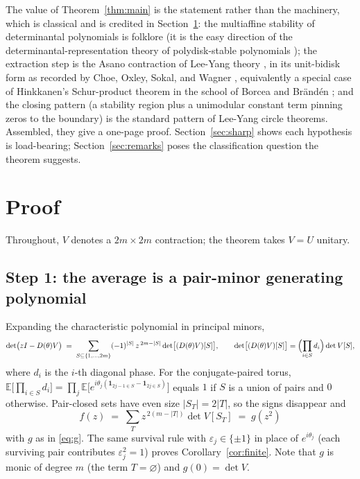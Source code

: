 \documentclass[11pt]{amsart}
\theoremstyle{definition}
\theoremstyle{remark}
\newcommand{\E}{\mathbb{E}}
\begin{document}
The value of Theorem~\ref{thm:main} is the statement rather than the machinery, which is classical and is credited in Section~\ref{sec:proof}: the multiaffine stability of determinantal polynomials is folklore (it is the easy direction of the determinantal-representation theory of polydisk-stable polynomials \cite{GKW13}); the extraction step is the Asano contraction of Lee-Yang theory \cite{Asa70, Rue71}, in its unit-bidisk form as recorded by Choe, Oxley, Sokal, and Wagner \cite[Remark after Prop.~4.19]{COSW04}, equivalently a special case of Hinkkanen's Schur-product theorem \cite{Hin97} in the school of Borcea and Br\"and\'en \cite{BB09, Wag11}; and the closing pattern (a stability region plus a unimodular constant term pinning zeros to the boundary) is the standard pattern of Lee-Yang circle theorems. Assembled, they give a one-page proof. Section~\ref{sec:sharp} shows each hypothesis is load-bearing; Section~\ref{sec:remarks} poses the classification question the theorem suggests.

\section{Proof}\label{sec:proof}

Throughout, $V$ denotes a $2m \times 2m$ contraction; the theorem takes $V = U$ unitary.

\subsection*{Step 1: the average is a pair-minor generating polynomial}
Expanding the characteristic polynomial in principal minors,
\[
\det\bigl(zI - D(\theta)V\bigr) \;=\; \sum_{S \subseteq \{1,\ldots,2m\}} (-1)^{|S|}\, z^{\,2m-|S|} \det\bigl[(D(\theta)V)[S]\bigr],
\qquad \det\bigl[(D(\theta)V)[S]\bigr] = \Bigl(\prod_{i \in S} d_i\Bigr) \det V[S],
\]
where $d_i$ is the $i$-th diagonal phase. For the conjugate-paired torus, $\E\bigl[\prod_{i \in S} d_i\bigr] = \prod_j \E\bigl[e^{i\theta_j(\mathbf{1}_{2j-1 \in S} - \mathbf{1}_{2j \in S})}\bigr]$ equals $1$ if $S$ is a union of pairs and $0$ otherwise. Pair-closed sets have even size $|S_T| = 2|T|$, so the signs disappear and
\begin{equation}\label{eq:f-is-g}
f(z) \;=\; \sum_{T} z^{\,2(m-|T|)} \det V[S_T] \;=\; g(z^2)
\end{equation}
with $g$ as in \eqref{eq:g}. The same survival rule with $\varepsilon_j \in \{\pm 1\}$ in place of $e^{i\theta_j}$ (each surviving pair contributes $\varepsilon_j^2 = 1$) proves Corollary~\ref{cor:finite}. Note that $g$ is monic of degree $m$ (the term $T = \varnothing$) and $g(0) = \det V$.
\end{document}

